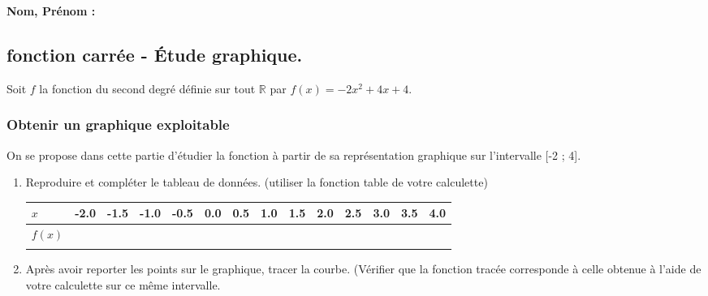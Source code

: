 \documentclass[paper=a4, fontsize=9pt]{scrartcl} %
\begin{document}

\newtheorem{Definition}{Définition}
\newtheorem{Theorem}{Théorème}
\newtheorem{Proposition}{Propriété}

\renewcommand{\labelitemi}{$\bullet$}
\renewcommand{\labelitemii}{$\circ$}

\setlength{\columnseprule}{1pt}

\textbf{Nom, Prénom :}

\subsection*{fonction carrée - Étude graphique.}

Soit $f$ la fonction du second degré définie sur tout $\mathbb{R}$ par $f(x) = -2x^2 + 4x +4$.

\subsubsection*{Obtenir un graphique exploitable}

On se propose dans cette partie d'étudier la fonction à partir de sa représentation graphique sur l'intervalle [-2 ; 4].

\begin{enumerate}
\item Reproduire et compléter le tableau de données. (utiliser la fonction table de votre calculette)
  \begin{center}
    \begin{tabular}{| l || c | c | c | c | c | c | c | c| c | c | c | c | c |}
      \hline
      $x$ & -2.0 & -1.5 & -1.0 & -0.5 & 0.0 & 0.5 & 1.0 & 1.5 & 2.0 & 2.5 & 3.0 & 3.5 & 4.0\\
      \hline
      $f(x)$ &  &  &  &  &  &  &  &  &  &  &  &  & \\
             &  &  &  &  &  &  &  &  &  &  &  &  & \\

      \hline
    \end{tabular}
  \end{center}

\item Après avoir reporter les points sur le graphique, tracer la courbe. (Vérifier que la fonction tracée corresponde à celle obtenue à l'aide de votre calculette sur ce même intervalle.
\end{enumerate}
\end{document}
